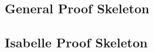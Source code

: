 \begin{figure}[H]
    \hfill
    \hfill
    \hfill
\end{figure}

\subsection{General Proof Skeleton}
\label{app:vm3}


\subsection{Isabelle Proof Skeleton}
\label{app:vm4}

